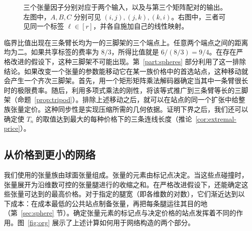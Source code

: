 \begin{figure}[!htbp]
\centering
{}
\caption{三个张量因子分别对应于两个输入，以及与第三个矩阵配对的输出。左图中，\(A,B,C\) 分别可见 \((i,j),(j,k),(k,i)\)。右图中，三者可见同一个标签 \(\ell\in[r]\)，并各自施加自己的线性映射。}\label{fig:three-wires}
\end{figure}

临界比值出现在三条臂长均为一的三脚架的三个端点上。任意两个端点之间的距离均为二。如果共享标签的费率为 \(8/3\)，所得比值就是 \(6/(8/3)=9/4\)。在存在严格改进的假设下，这种三脚架不可能出现。第~\ref{part:spheres} 部分利用了这一排除结论。如果改变一个张量的参数能移动它在某一族价格中的首选站点，这种移动就会产生一个齐次三脚架。首先，用一个矩形矩阵乘法解码器确定当其中一条臂很长时的极限费率。随后，利用多项式乘法的刚性，将该等式推广到三条臂等长的三脚架（命题~\ref{prop:tripod}）。排除上述移动之后，就可以在站点的同一个扩张中给整族张量定价。这种同步性是实现压缩所需的几何依据。证明下界之后，我们还可以确定使 \(T_n\) 的取值达到最大的每种价格下的三条连线长度（推论~\ref{cor:extremal-price}）。

\subsection{从价格到更小的网络}

我们使用的张量族由球面张量组成。张量的元素由标记点决定。当这些点碰撞时，张量展开为沿维数可控的张量腿进行的收缩之和。在严格改进假设下，还能确定这些张量可达到的最高价格。对于指定的腿宽（即各维数的对数），它们渐近达到以下成本：在成本最低的公共站点制备张量，再把每条腿运往其目的地（第~\ref{sec:sphere} 节）。确定张量元素的标记点与决定价格的站点发挥着不同的作用。图~\ref{fig:org} 展示了上述计算如何用于网络构造的两个部分。

